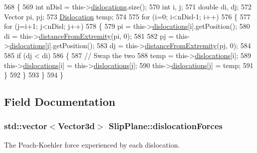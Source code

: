 \begin{DoxyCode}
568 \{
569   \textcolor{keywordtype}{int} nDisl = this->\hyperlink{classSlipPlane_ad92c7c409f7e161db449528389180910}{dislocations}.size();
570   \textcolor{keywordtype}{int} i, j;
571   \textcolor{keywordtype}{double} di, dj;
572   Vector pi, pj;
573   \hyperlink{classDislocation}{Dislocation} temp;
574 
575   \textcolor{keywordflow}{for} (i=0; i<nDisl-1; i++)
576     \{
577       \textcolor{keywordflow}{for} (j=i+1; j<nDisl; j++)
578         \{
579           pi = this->\hyperlink{classSlipPlane_ad92c7c409f7e161db449528389180910}{dislocations}[i].getPosition();
580           di = this->\hyperlink{classSlipPlane_a3523030cccb520b5253a811d062f3ddf}{distanceFromExtremity}(pi, 0);
581           
582           pj = this->\hyperlink{classSlipPlane_ad92c7c409f7e161db449528389180910}{dislocations}[j].getPosition();
583           dj = this->\hyperlink{classSlipPlane_a3523030cccb520b5253a811d062f3ddf}{distanceFromExtremity}(pj, 0);
584           
585           \textcolor{keywordflow}{if} (dj < di)
586             \{
587               \textcolor{comment}{// Swap the two}
588               temp = this->\hyperlink{classSlipPlane_ad92c7c409f7e161db449528389180910}{dislocations}[i];
589               this->\hyperlink{classSlipPlane_ad92c7c409f7e161db449528389180910}{dislocations}[i] = this->\hyperlink{classSlipPlane_ad92c7c409f7e161db449528389180910}{dislocations}[j];
590               this->\hyperlink{classSlipPlane_ad92c7c409f7e161db449528389180910}{dislocations}[j] = temp;
591             \}
592         \}
593     \}
594 \}
\end{DoxyCode}


\subsection{Field Documentation}
\hypertarget{classSlipPlane_a2a74ae1f66a59e53a3ca0c9b81b28f7d}{
\subsubsection[{dislocation\-Forces}]{\setlength{\rightskip}{0pt plus 5cm}std\-::vector$<${\bf Vector3d}$>$ Slip\-Plane\-::dislocation\-Forces\hspace{0.3cm}{\ttfamily [protected]}}}\label{db/d25/classSlipPlane_a2a74ae1f66a59e53a3ca0c9b81b28f7d}


The Peach-\/\-Koehler force experienced by each dislocation. 

